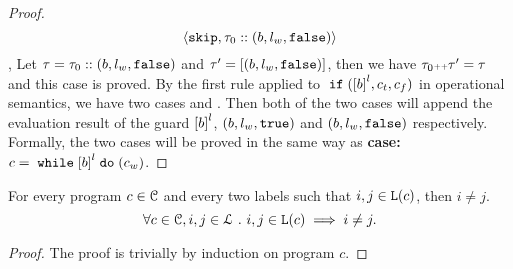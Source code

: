 \begin{proof}
\[    \langle {
    \ensuremath{\mathtt{skip}},
    \ensuremath{\mathtt{\tau}}_0 :: (b, l_w, \ensuremath{\mathtt{false}})} \rangle
  \],
  Let $\mathtt{\tau} = \mathtt{\tau}_0 ::(b, l_w, \mathtt{false})$ and $\mathtt{\tau}' =  [(b, l_w, \mathtt{false})]$,
  then we have $\mathtt{\tau}_0 {\scriptscriptstyle ++} \mathtt{\tau}' = \mathtt{\tau}$ and this case is proved.
  By the first rule applied to $\eif(\clabel{b}^l, c_t, c_f)$ in operational semantics,
  we have two cases  and .
  Then both of the two cases will append the evaluation result of the guard $\clabel{b}^l$, $(b, l_w, \mathtt{true})$ and $(b, l_w, \mathtt{false})$ respectively.
  \\
  Formally, the two cases will be proved in the same way as \textbf{case: $c = \ewhile \clabel{b}^{l} \edo (c_w)$}.
\end{proof}
\begin{lemma}
  For every program $c \in \mathcal{C}$ and every two labels such that
  $i, j \in \mathtt{L}(c)$, then $i \neq j$.
  \[
    \forall c \in \mathcal{C}, i, j \in \mathcal{L} ~.~ i, j \in \mathtt{L}(c)\implies i \neq j.
    \]
\end{lemma}
  \begin{proof}
    The proof is trivially by induction on program $c$.
  \end{proof}
